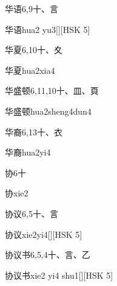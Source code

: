 \begin{entry}{华语}{6,9}{⼗、⾔}
  \begin{phonetics}{华语}{hua2 yu3}[][HSK 5]
  \end{phonetics}
\end{entry}

\begin{entry}{华夏}{6,10}{⼗、⼢}
  \begin{phonetics}{华夏}{hua2xia4}
  \end{phonetics}
\end{entry}

\begin{entry}{华盛顿}{6,11,10}{⼗、⽫、⾴}
  \begin{phonetics}{华盛顿}{hua2sheng4dun4}
  \end{phonetics}
\end{entry}

\begin{entry}{华裔}{6,13}{⼗、⾐}
  \begin{phonetics}{华裔}{hua2yi4}
  \end{phonetics}
\end{entry}

\begin{entry}{协}{6}{⼗}
  \begin{phonetics}{协}{xie2}
  \end{phonetics}
\end{entry}

\begin{entry}{协议}{6,5}{⼗、⾔}
  \begin{phonetics}{协议}{xie2yi4}[][HSK 5]
  \end{phonetics}
\end{entry}

\begin{entry}{协议书}{6,5,4}{⼗、⾔、⼄}
  \begin{phonetics}{协议书}{xie2 yi4 shu1}[][HSK 5]
  \end{phonetics}
\end{entry}

